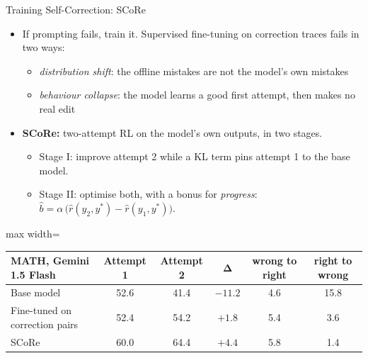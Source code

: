\begin{frame}{Training Self-Correction: SCoRe}
    \begin{itemize}\itemsep0.3em
        \item If prompting fails, train it. Supervised fine-tuning on correction traces fails in two ways:
        \begin{itemize}\itemsep0.1em
            \item \emph{distribution shift}: the offline mistakes are not the model's own mistakes
            \item \emph{behaviour collapse}: the model learns a good first attempt, then makes no real edit
        \end{itemize}
        \item \textbf{SCoRe:} two-attempt RL on the model's own outputs, in two stages.
        \begin{itemize}\itemsep0.1em
            \item Stage I: improve attempt 2 while a KL term pins attempt 1 to the base model.
            \item Stage II: optimise both, with a bonus for \emph{progress}: $\hat b = \alpha\,\big(\hat r(y_2,y^*) - \hat r(y_1,y^*)\big)$.
        \end{itemize}
    \end{itemize}
    \begin{center}
    \small
    \begin{adjustbox}{max width=\linewidth}\begin{tabular}{lccccc}
        \toprule
        \textbf{MATH, Gemini 1.5 Flash} & \textbf{Attempt 1} & \textbf{Attempt 2} & $\boldsymbol{\Delta}$ & \textbf{wrong to right} & \textbf{right to wrong} \\
        \midrule
        Base model & 52.6 & 41.4 & $-11.2$ & 4.6 & 15.8 \\
        Fine-tuned on correction pairs & 52.4 & 54.2 & $+1.8$ & 5.4 & 3.6 \\
        \rowcolor{KAUSTcyan!12} SCoRe & 60.0 & 64.4 & $+4.4$ & 5.8 & 1.4 \\
        \bottomrule
    \end{tabular}\end{adjustbox}
    \end{center}
\end{frame}

